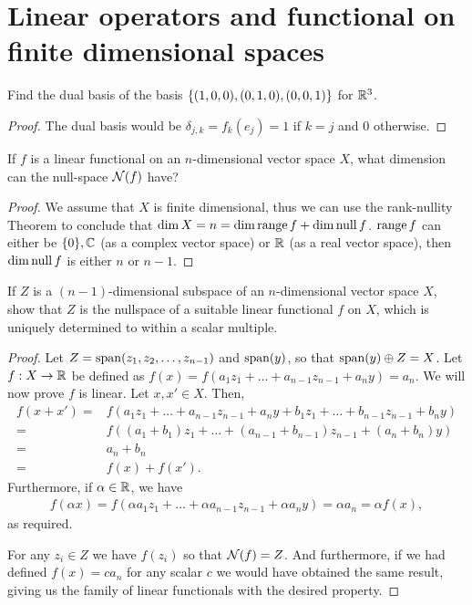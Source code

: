 \section{Linear operators and functional on finite dimensional spaces}


\begin{exercise}{3}
Find the dual basis of the basis $\{(1,0,0), (0,1,0), (0,0,1)\}$ for $\mathbb{R}^3$.
\end{exercise}
\begin{proof}
The dual basis would be $\delta_{j,k}=f_k(e_j)=1$ if $k=j$ and 0 otherwise.
\end{proof}

\begin{exercise}{5}
If $f$ is a linear functional on an $n$-dimensional vector space $X$, what dimension can the null-space $\mathcal{N}(f)$ have?
\end{exercise}
\begin{proof}
We assume that $X$ is finite dimensional, thus we can use the rank-nullity Theorem to conclude that $\dim X = n=\dim\operatorname*{range} f +\dim\operatorname*{null} f$.
$\operatorname*{range} f$ can either be $\{0\}, \mathbb{C}$ (as a complex vector space) or $\mathbb{R}$ (as a real vector space), then $\dim\operatorname*{null} f$ is either $n$ or $n-1$.
\end{proof}

\begin{exercise}{8}
If $Z$ is a $(n-1)$-dimensional subspace of an $n$-dimensional vector space $X$, show that $Z$ is the nullspace of a suitable linear functional $f$ on $X$, which is uniquely determined to within a scalar multiple.
\end{exercise}
\begin{proof}
Let $Z=\operatorname*{span}(z_1,z_2,\dots,z_{n-1})$ and $\operatorname*{span}(y)$, so that $\operatorname*{span}(y)\oplus Z=X$.
Let $f:X\to\mathbb{R}$ be defined as $f(x)=f(a_1z_1+\dots+a_{n-1}z_{n-1}+a_ny)=a_n$.
We will now prove $f$ is linear.
Let $x,x'\in X$.
Then,
\begin{align*}
    f(x+x') 
    =& f(a_1z_1+\dots+a_{n-1}z_{n-1}+a_ny+b_1z_1+\dots+b_{n-1}z_{n-1}+b_ny)\\
    =& f((a_1+b_1)z_1+\dots+(a_{n-1}+b_{n-1})z_{n-1}+(a_n+b_n)y)\\
    =& a_n+b_n\\
    =& f(x)+f(x').
\end{align*}
Furthermore, if $\alpha\in\mathbb{R}$, we have
\begin{align*}
    f(\alpha x)
    = f(\alpha a_1z_1+\dots+\alpha a_{n-1}z_{n-1}+\alpha a_ny)
    = \alpha a_n
    = \alpha f(x),
\end{align*}
as required.

For any $z_i\in Z$ we have $f(z_i)$ so that $\mathcal{N}(f)=Z$.
And furthermore, if we had defined $f(x)=ca_n$ for any scalar $c$ we would have obtained the same result, giving us the family of linear functionals with the desired property.
\end{proof}

